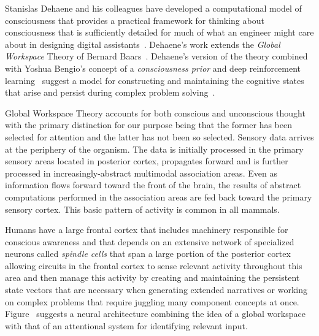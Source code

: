 

Stanislas Dehaene and his colleagues have developed a computational model of consciousness that provides a practical framework for thinking about consciousness that is sufficiently detailed for much of what an engineer might care about in designing digital assistants~\cite{Dehaene2014}. Dehaene's work extends the {\it{Global Workspace}} Theory of Bernard Baars~\cite{Baars1988}. Dehaene's version of the theory combined with Yoshua Bengio's concept of a {\it{consciousness prior}} and deep reinforcement learning~\cite{MnihetalCoRR-13,NairetalCoRR-15} suggest a model for constructing and maintaining the cognitive states that arise and persist during complex problem solving~\cite{BengioCoRR-17}.

Global Workspace Theory accounts for both conscious and unconscious thought with the primary distinction for our purpose being that the former has been selected for attention and the latter has not been so selected. Sensory data arrives at the periphery of the organism. The data is initially processed in the primary sensory areas located in posterior cortex, propagates forward and is further processed in increasingly-abstract multimodal association areas. Even as information flows forward toward the front of the brain, the results of abstract computations performed in the association areas are fed back toward the primary sensory cortex. This basic pattern of activity is common in all mammals.

Humans have a large frontal cortex that includes machinery responsible for conscious awareness and that depends on an extensive network of specialized neurons called {\it{spindle cells}} that span a large portion of the posterior cortex allowing circuits in the frontal cortex to sense relevant activity throughout this area and then manage this activity by creating and maintaining the persistent state vectors that are necessary when generating extended narratives or working on complex problems that require juggling many component concepts at once. Figure~{} suggests a neural architecture combining the idea of a global workspace with that of an attentional system for identifying relevant input.


